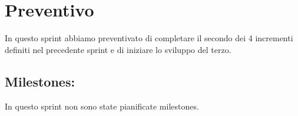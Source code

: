 \section{Preventivo}

In questo sprint abbiamo preventivato di completare il secondo dei 4 incrementi definiti nel precedente sprint e di iniziare lo sviluppo del terzo.

\subsection{Milestones:}  

In questo sprint non sono state pianificate milestones.